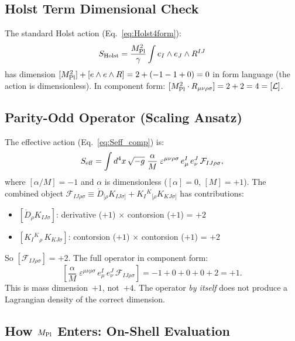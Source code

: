 \documentclass[aps,prd,twocolumn,superscriptaddress,showpacs,preprintnumbers,nofootinbib,longbibliography,floatfix]{revtex4-2}
\newcommand{\MPl}{M_{\rm Pl}}
\begin{document}
\subsection{Holst Term Dimensional Check}

The standard Holst action (Eq.~\ref{eq:Holst4form}):
\begin{equation}
S_{\rm Holst} = \frac{\MPl^2}{\gamma}\int e_I\wedge e_J\wedge R^{IJ}
\end{equation}
has dimension $[\MPl^2] + [e\wedge e\wedge R] = 2 + (-1-1+0) = 0$ in form language (the action is dimensionless). In component form: $[\MPl^2 \cdot R_{\mu\nu\rho\sigma}] = 2+2 = 4 = [\mathcal{L}]$. \checkmark

\subsection{Parity-Odd Operator (Scaling Ansatz)}

The effective action (Eq.~\ref{eq:Seff_comp}) is:
\begin{equation}
S_{\rm eff} = \int d^4x\,\sqrt{-g}\;\frac{\alpha}{M}\;\varepsilon^{\mu\nu\rho\sigma}\,e^I_\mu\,e^J_\nu\,\mathcal{F}_{IJ\rho\sigma},
\end{equation}
where $[\alpha/M] = -1$ and $\alpha$ is dimensionless ($[\alpha] = 0$, $[M] = +1$). The combined object $\mathcal{F}_{IJ\rho\sigma} \equiv \mathring{D}_{[\rho}K_{IJ\sigma]} + K_{I}{}^{K}{}_{[\rho}K_{KJ\sigma]}$ has contributions:
\begin{itemize}[leftmargin=*]
\item $[\mathring{D}_\rho K_{IJ\sigma}]$: derivative ($+1$) $\times$ contorsion ($+1$) = $+2$
\item $[K_{I}{}^K{}_\rho\,K_{KJ\sigma}]$: contorsion ($+1$) $\times$ contorsion ($+1$) = $+2$
\end{itemize}
So $[\mathcal{F}_{IJ\rho\sigma}] = +2$. The full operator in component form:
\begin{equation}
\left[\frac{\alpha}{M}\;\varepsilon^{\mu\nu\rho\sigma}\,e^I_\mu\,e^J_\nu\,\mathcal{F}_{IJ\rho\sigma}\right] = -1 + 0 + 0 + 0 + 2 = +1.
\end{equation}
This is mass dimension~$+1$, not~$+4$. The operator \textit{by itself} does not produce a Lagrangian density of the correct dimension.

\subsection{How $\MPl$ Enters: On-Shell Evaluation}\label{sec:dimbridge}
\end{document}
